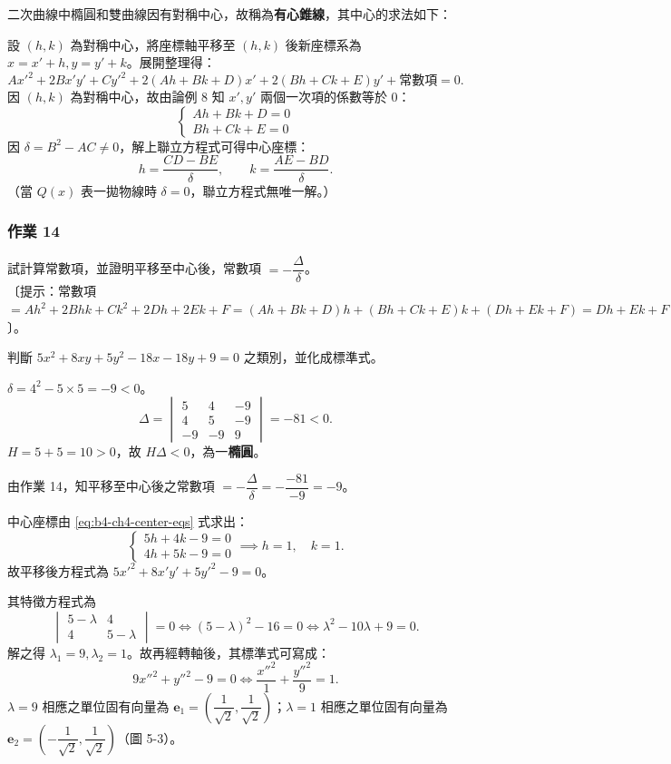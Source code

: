 二次曲線中橢圓和雙曲線因有對稱中心，故稱為\textbf{有心錐線}，其中心的求法如下：

設 $(h, k)$ 為對稱中心，將座標軸平移至 $(h, k)$ 後新座標系為 $x = x' + h, y = y' + k$。展開整理得：
\[
Ax'^2 + 2Bx'y' + Cy'^2 + 2(Ah + Bk + D)x' + 2(Bh + Ck + E)y' + \text{常數項} = 0.
\]
因 $(h, k)$ 為對稱中心，故由論例 8 知 $x', y'$ 兩個一次項的係數等於 0：
\begin{equation}
\begin{cases}
Ah + Bk + D = 0 \\
Bh + Ck + E = 0
\end{cases}
\label{eq:b4-ch4-center-eqs}
\end{equation}
因 $\delta = B^2 - AC \ne 0$，解上聯立方程式可得中心座標：
\[
h = \frac{CD - BE}{\delta}, \qquad k = \frac{AE - BD}{\delta}.
\]
（當 $Q(x)$ 表一拋物線時 $\delta = 0$，聯立方程式無唯一解。）

\subsubsection*{作業 14}
試計算常數項，並證明平移至中心後，常數項 $= -\dfrac{\Delta}{\delta}$。\\
〔提示：常數項 $= Ah^2 + 2Bhk + Ck^2 + 2Dh + 2Ek + F = (Ah+Bk+D)h + (Bh+Ck+E)k + (Dh+Ek+F) = Dh + Ek + F$〕。

\begin{example}
判斷 $5x^2 + 8xy + 5y^2 - 18x - 18y + 9 = 0$ 之類別，並化成標準式。
\end{example}

\begin{solution}
$\delta = 4^2 - 5 \times 5 = -9 < 0$。
\[
\Delta = \begin{vmatrix} 5 & 4 & -9 \\ 4 & 5 & -9 \\ -9 & -9 & 9 \end{vmatrix} = -81 < 0.
\]
$H = 5 + 5 = 10 > 0$，故 $H\Delta < 0$，為一\textbf{橢圓}。

由作業 14，知平移至中心後之常數項 $= -\dfrac{\Delta}{\delta} = -\dfrac{-81}{-9} = -9$。

中心座標由 \eqref{eq:b4-ch4-center-eqs} 式求出：
\[
\begin{cases}
5h + 4k - 9 = 0 \\
4h + 5k - 9 = 0
\end{cases}
\implies h = 1, \quad k = 1.
\]
故平移後方程式為 $5{x'}^2 + 8x'y' + 5{y'}^2 - 9 = 0$。

其特徵方程式為
\[
\begin{vmatrix} 5 - \lambda & 4 \\ 4 & 5 - \lambda \end{vmatrix} = 0 \iff (5 - \lambda)^2 - 16 = 0 \iff \lambda^2 - 10\lambda + 9 = 0.
\]
解之得 $\lambda_1 = 9, \lambda_2 = 1$。故再經轉軸後，其標準式可寫成：
\[
9{x''}^2 + {y''}^2 - 9 = 0 \iff \frac{{x''}^2}{1} + \frac{{y''}^2}{9} = 1.
\]
$\lambda = 9$ 相應之單位固有向量為 $\mathbf{e}_1 = \left(\dfrac{1}{\sqrt{2}}, \dfrac{1}{\sqrt{2}}\right)$；$\lambda = 1$ 相應之單位固有向量為 $\mathbf{e}_2 = \left(-\dfrac{1}{\sqrt{2}}, \dfrac{1}{\sqrt{2}}\right)$（圖 5-3）。
\end{solution}

